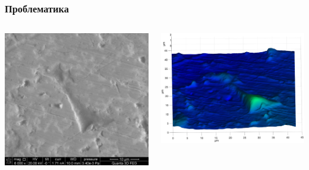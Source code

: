 \documentclass{beamer}
\begin{document}
\begin{frame}[c]
    \frametitle{Проблематика}
    \begin{columns}
        \begin{column}{0.38\textwidth}
            \includegraphics[width=1.0\linewidth]{VA.png}
        \end{column}
        \begin{column}{0.58\textwidth}
            \includegraphics[width=1.0\linewidth]{tin-copper.eps}
        \end{column}
    \end{columns}
\end{frame}
\end{document}
